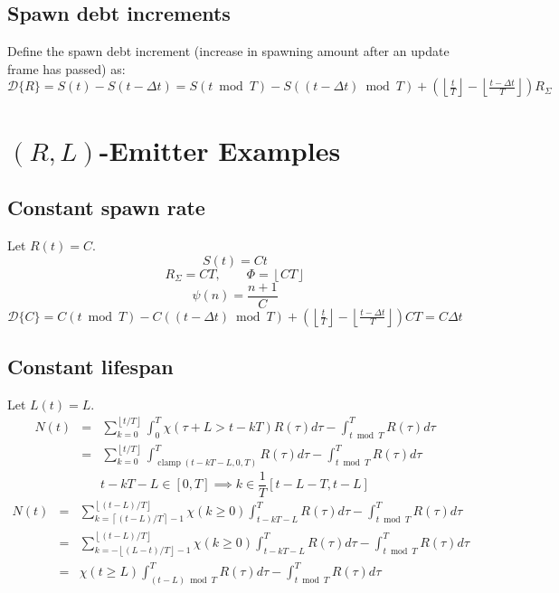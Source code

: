 \documentclass[10pt]{report}
\newcommand{\floor}[1]{\left\lfloor #1 \right\rfloor}
\newcommand{\ceil}[1]{\left\lceil #1 \right\rceil}
\DeclareMathOperator{\clamp}{clamp}
\begin{document}
\subsection{Spawn debt increments}
Define the spawn debt increment (increase in spawning amount after an update frame has passed) as:
\begin{equation}\mathcal{D}\{R\}=S(t)-S(t-\Delta t)=S(t\bmod T)-S((t-\Delta t)\bmod T)+(\floor{\tfrac{t}{T}}-\floor{\tfrac{t-\Delta t}{T}})R_\Sigma\end{equation}


\section{$(R,L)$-Emitter Examples}

\subsection{Constant spawn rate}
Let $R(t)=C$.
\begin{equation}S(t)=Ct\end{equation}
\begin{equation}R_\Sigma=CT,\qquad\Phi=\floor{CT}\end{equation}
\begin{equation}\psi(n)=\frac{n+1}{C}\end{equation}
\begin{equation}\mathcal{D}\{C\}=C(t\bmod T)-C((t-\Delta t)\bmod T)+(\floor{\tfrac{t}{T}}-\floor{\tfrac{t-\Delta t}{T}})CT=C\Delta t\end{equation}

\subsection{Constant lifespan}
Let $L(t)=L$.
\begin{eqnarray}
N(t)&=&\sum_{k=0}^{\floor{t/T}}\int_0^T\chi(\tau+L>t-kT)R(\tau)d\tau-\int_{t\bmod T}^TR(\tau)d\tau\\
&=&\sum_{k=0}^{\floor{t/T}}\int_{\clamp(t-kT-L,0,T)}^TR(\tau)d\tau-\int_{t\bmod T}^TR(\tau)d\tau
\end{eqnarray}
$$t-kT-L\in[0,T]\implies k\in\frac{1}{T}[t-L-T,t-L]$$
\begin{eqnarray}
N(t)&=&\sum_{k=\ceil{(t-L)/T}-1}^{\floor{(t-L)/T}}\chi(k\geq0)\int_{t-kT-L}^TR(\tau)d\tau-\int_{t\bmod T}^TR(\tau)d\tau\\
&=&\sum_{k=-\floor{(L-t)/T}-1}^{\floor{(t-L)/T}}\chi(k\geq0)\int_{t-kT-L}^TR(\tau)d\tau-\int_{t\bmod T}^TR(\tau)d\tau\\
&=&\chi(t\geq L)\int_{(t-L)\bmod T}^TR(\tau)d\tau-\int_{t\bmod T}^TR(\tau)d\tau
\end{eqnarray}
\end{document}

